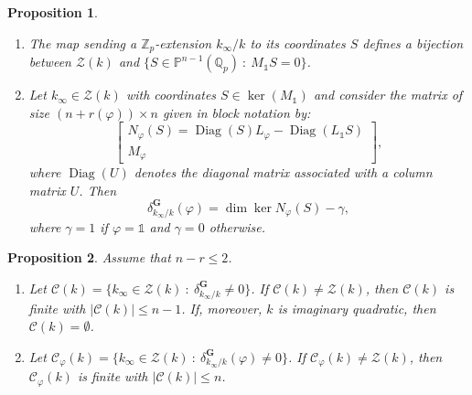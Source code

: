 \documentclass[10pt,a4paper]{amsart}
\newtheorem{proposition}{Proposition}
\DeclareMathOperator{\Diag}{Diag}
\newcommand\Qp{{\mathbb{Q}_p}}
\newcommand\Zp{{\mathbb{Z}_p}}
\newcommand\bP{\mathbb{P}}
\newcommand\sC{\mathscr{C}}
\newcommand\sZ{\mathscr{Z}}
\begin{document}
	\begin{proposition}\label{prop:prop_clef_non_cyc}
		\begin{enumerate}
			\item The map sending a $\Zp$-extension $k_\infty/k$ to its coordinates $S$ defines a bijection between $\sZ(k)$ and $\{S \in \bP^{n-1}(\Qp) \ \colon \ M_{\mathds{1}}S=0\}$.
			\item Let $k_\infty \in \sZ(k)$ with coordinates $S\in \ker(M_\mathds{1})$ and consider the matrix of size $(n+r(\varphi))\times n$ given in block notation by:
			\begin{equation}\label{eq:def_N_phi_S}
				\begin{bmatrix}
				N_\varphi(S)=\Diag(S)L_\varphi - \Diag(L_\mathds{1}S)\\
				M_\varphi
			\end{bmatrix},
			\end{equation}
			where $\Diag(U)$ denotes the diagonal matrix associated with a column matrix $U$.
			Then $$\delta_{k_\infty/k}^\textbf{G}(\varphi) = \dim \ker N_\varphi(S) - \gamma,$$ 
			where $\gamma=1$ if $\varphi=\mathds{1}$ and $\gamma=0$ otherwise. 
		\end{enumerate}
	\end{proposition}

	\begin{proposition}\label{prop:non_cyc_trivial_char}
		Assume that $n-r\leq 2$. \begin{enumerate}
			\item  Let $\sC(k)=\{k_\infty\in\sZ(k) \ \colon\ \delta_{k_\infty/k}^\textbf{G}\neq 0\}$. If $\sC(k)\neq \sZ(k)$, then $\sC(k)$ is finite with $|\sC(k)|\leq n-1$. If, moreover, $k$ is imaginary quadratic, then $\sC(k)=\emptyset$.
			\item Let  $\sC_\varphi(k)=\{k_\infty\in\sZ(k) \ \colon\ \delta_{k_\infty/k}^\textbf{G}(\varphi)\neq 0\}$. If $\sC_\varphi(k)\neq \sZ(k)$, then $\sC_\varphi(k)$ is finite with $|\sC(k)|\leq n$.
		\end{enumerate}
	\end{proposition}
\end{document}
